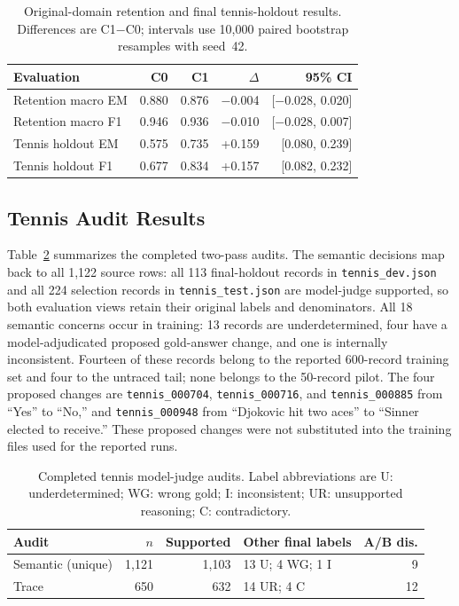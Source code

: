 \documentclass[conference]{IEEEtran}
\begin{document}
\begin{table}[t]
\centering
\caption{Original-domain retention and final tennis-holdout results. Differences are C1$-$C0; intervals use 10,000 paired bootstrap resamples with seed~42.}
\label{tab:retention-final}
\setlength{\tabcolsep}{2.8pt}
{\footnotesize
\begin{tabular}{lrrrr}
\toprule
\textbf{Evaluation} & \textbf{C0} & \textbf{C1} & \textbf{$\Delta$} & \textbf{95\% CI} \\
\midrule
Retention macro EM & 0.880 & 0.876 & $-$0.004 & [$-$0.028, 0.020] \\
Retention macro F1 & 0.946 & 0.936 & $-$0.010 & [$-$0.028, 0.007] \\
\rowcolor{gray!18}
Tennis holdout EM & 0.575 & 0.735 & +0.159 & [0.080, 0.239] \\
\rowcolor{gray!18}
Tennis holdout F1 & 0.677 & 0.834 & +0.157 & [0.082, 0.232] \\
\bottomrule
\end{tabular}
}
\end{table}

\subsection{Tennis Audit Results}

Table~\ref{tab:tennis-audits} summarizes the completed two-pass audits. The semantic decisions map back to all 1,122 source rows: all 113 final-holdout records in \texttt{tennis\_dev.json} and all 224 selection records in \texttt{tennis\_test.json} are model-judge supported, so both evaluation views retain their original labels and denominators. All 18 semantic concerns occur in training: 13 records are underdetermined, four have a model-adjudicated proposed gold-answer change, and one is internally inconsistent. Fourteen of these records belong to the reported 600-record training set and four to the untraced tail; none belongs to the 50-record pilot. The four proposed changes are \texttt{tennis\_000704}, \texttt{tennis\_000716}, and \texttt{tennis\_000885} from ``Yes'' to ``No,'' and \texttt{tennis\_000948} from ``Djokovic hit two aces'' to ``Sinner elected to receive.'' These proposed changes were not substituted into the training files used for the reported runs.

\begin{table}[t]
\centering
\caption{Completed tennis model-judge audits. Label abbreviations are U: underdetermined; WG: wrong gold; I: inconsistent; UR: unsupported reasoning; C: contradictory.}
\label{tab:tennis-audits}
\setlength{\tabcolsep}{2.8pt}
{\footnotesize
\begin{tabular}{lrrlr}
\toprule
\textbf{Audit} & \textbf{$n$} & \textbf{Supported} & \textbf{Other final labels} & \textbf{A/B dis.} \\
\midrule
Semantic (unique) & 1{,}121 & 1{,}103 & 13 U; 4 WG; 1 I & 9 \\
Trace & 650 & 632 & 14 UR; 4 C & 12 \\
\bottomrule
\end{tabular}
}
\end{table}
\end{document}
